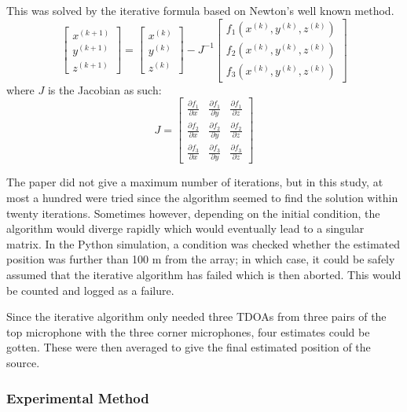\documentclass{report}
\begin{document}
This was solved by the iterative formula based on Newton's well known method.
\begin{equation}
\begin{bmatrix}
	x^{(k+1)} \\
	y^{(k+1)} \\
	z^{(k+1)}
\end{bmatrix}
=
\begin{bmatrix}
	x^{(k)} \\
	y^{(k)} \\
	z^{(k)}
\end{bmatrix}
-
J^{-1}
\begin{bmatrix}
	f_1\left(x^{(k)}, y^{(k)}, z^{(k)}\right) \\
	f_2\left(x^{(k)}, y^{(k)}, z^{(k)}\right) \\
	f_3\left(x^{(k)}, y^{(k)}, z^{(k)}\right)
\end{bmatrix}
\end{equation}
where $J$ is the Jacobian as such:
\begin{equation}
J = 
\begin{bmatrix}
\frac{\partial f_1}{\partial x}
& \frac{\partial f_1}{\partial y}
& \frac{\partial f_1}{\partial z} \\
\frac{\partial f_2}{\partial x}
& \frac{\partial f_2}{\partial y}
& \frac{\partial f_2}{\partial z} \\
\frac{\partial f_3}{\partial x}
& \frac{\partial f_3}{\partial y}
& \frac{\partial f_3}{\partial z}
\end{bmatrix}
\end{equation}

The paper did not give a maximum number of iterations, but in this study, at most a hundred were tried since the algorithm seemed to find the solution within twenty iterations. Sometimes however, depending on the initial condition, the algorithm would diverge rapidly which would eventually lead to a singular matrix. In the Python simulation, a condition was checked whether the estimated position was further than 100 \si{m} from the array; in which case, it could be safely assumed that the iterative algorithm has failed which is then aborted. This would be counted and logged as a failure.

Since the iterative algorithm only needed three TDOAs from three pairs of the top microphone with the three corner microphones, four estimates could be gotten. These were then averaged to give the final estimated position of the source.

\subsubsection{Experimental Method}
\end{document}
